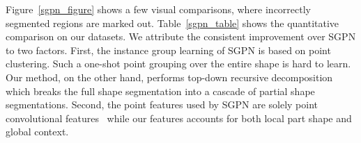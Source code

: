 \begin{table}[!t]\centering\small
 \vspace{5pt}
\caption{Comparison with SGPN~\cite{Wang2017SGPN} on fine-grained instance segmentation over the FineSeg dataset. The metric is AP () with IoU threshold being  and , respectively.}
\label{sgpn_table}\vspace{-8pt}
\end{table}

Figure~\ref{sgpn_figure} shows a few visual comparisons, where incorrectly segmented regions are marked out. Table~\ref{sgpn_table} shows the quantitative comparison on our datasets. We attribute the consistent improvement over SGPN to two factors. First, the instance group learning of SGPN is based on point clustering. Such a one-shot point grouping over the entire shape is hard to learn. Our method, on the other hand, performs top-down recursive decomposition which breaks the full shape segmentation into a cascade of partial shape segmentations. Second, the point features used by SGPN are solely point convolutional features~\cite{qi2016pointnet} while our features accounts for both local part shape and global context.
